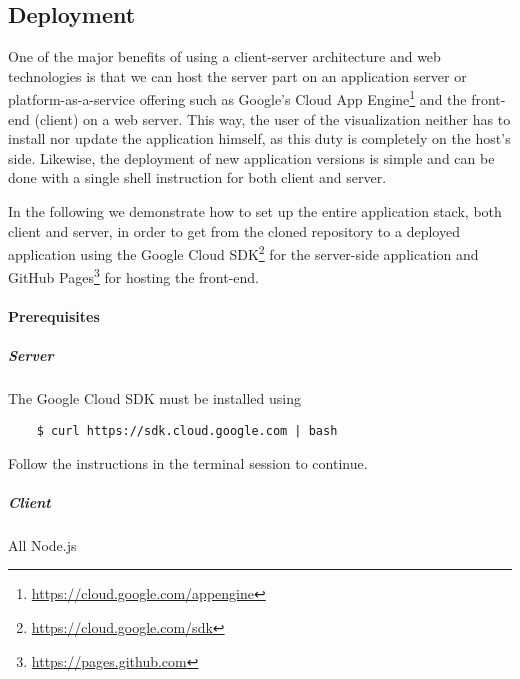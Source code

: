\subsection{Deployment}
One of the major benefits of using a client-server architecture and web technologies is that we can host the server part on an application server or platform-as-a-service offering such as Google's Cloud App Engine\footnote{\url{https://cloud.google.com/appengine}} and the front-end (client) on a web server.
This way, the user of the visualization neither has to install nor update the application himself, as this duty is completely on the host's side. Likewise, the deployment of new application versions is simple and can be done with a single shell instruction for both client and server.

In the following we demonstrate how to set up the entire application stack, both client and server, in order to get from the cloned repository to a deployed application using the Google Cloud SDK\footnote{\url{https://cloud.google.com/sdk}} for the server-side application and GitHub Pages\footnote{\url{https://pages.github.com}} for hosting the front-end.

\paragraph{Prerequisites}   

\subparagraph{Server}
The Google Cloud SDK must be installed using 
\begin{verbatim}
    $ curl https://sdk.cloud.google.com | bash
\end{verbatim}
Follow the instructions in the terminal session to continue. 

\subparagraph{Client}
All Node.js 